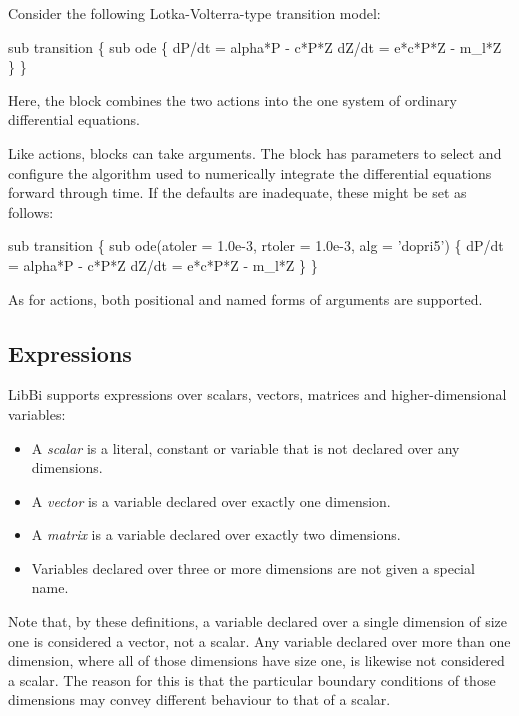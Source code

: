 Consider the following Lotka-Volterra-type transition
model:
\begin{bicode}
sub transition \{
  sub ode \{
    dP/dt = alpha*P - c*P*Z
    dZ/dt = e*c*P*Z - m_l*Z
  \}
\}
\end{bicode}
Here, the  block combines the two actions into the one system of
ordinary differential equations.

Like actions, blocks can take arguments. The  block has
parameters to select and configure the algorithm used to numerically integrate
the differential equations forward through time. If the defaults are
inadequate, these might be set as follows:
\begin{bicode}
sub transition \{
  sub ode(atoler = 1.0e-3, rtoler = 1.0e-3, alg = 'dopri5') \{
    dP/dt = alpha*P - c*P*Z
    dZ/dt = e*c*P*Z - m_l*Z
  \}
\}
\end{bicode}
As for actions, both positional and named forms of arguments are supported.

\subsection{Expressions\label{Expressions}}

LibBi supports expressions over scalars, vectors, matrices and
higher-dimensional variables:
\begin{itemize}
\item A \textit{scalar} is a literal, constant or variable that
  is not declared over any dimensions.
\item A \textit{vector} is a variable declared over
  exactly one dimension.
\item A \textit{matrix} is a variable declared over exactly two
  dimensions.
\item Variables declared over three or more dimensions are not given a special
  name.
\end{itemize}
Note that, by these definitions, a variable declared over a single dimension
of size one is considered a vector, not a scalar. Any variable declared over
more than one dimension, where all of those dimensions have size one, is
likewise not considered a scalar. The reason for this is that the particular
boundary conditions of those dimensions may convey different behaviour to that
of a scalar.

